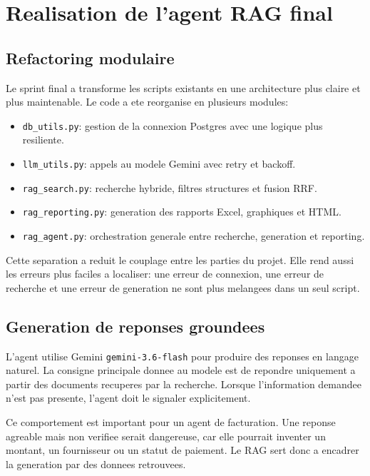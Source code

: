 \chapter{Realisation de l'agent RAG final}
\label{chap:agent-rag-final}

\section{Refactoring modulaire}

Le sprint final a transforme les scripts existants en une architecture plus claire et plus maintenable. Le code a ete reorganise en plusieurs modules:

\begin{itemize}
  \item \texttt{db\_utils.py}: gestion de la connexion Postgres avec une logique plus resiliente.
  \item \texttt{llm\_utils.py}: appels au modele Gemini avec retry et backoff.
  \item \texttt{rag\_search.py}: recherche hybride, filtres structures et fusion RRF.
  \item \texttt{rag\_reporting.py}: generation des rapports Excel, graphiques et HTML.
  \item \texttt{rag\_agent.py}: orchestration generale entre recherche, generation et reporting.
\end{itemize}

Cette separation a reduit le couplage entre les parties du projet. Elle rend aussi les erreurs plus faciles a localiser: une erreur de connexion, une erreur de recherche et une erreur de generation ne sont plus melangees dans un seul script.

\section{Generation de reponses groundees}

L'agent utilise Gemini \texttt{gemini-3.6-flash} pour produire des reponses en langage naturel. La consigne principale donnee au modele est de repondre uniquement a partir des documents recuperes par la recherche. Lorsque l'information demandee n'est pas presente, l'agent doit le signaler explicitement.

Ce comportement est important pour un agent de facturation. Une reponse agreable mais non verifiee serait dangereuse, car elle pourrait inventer un montant, un fournisseur ou un statut de paiement. Le RAG sert donc a encadrer la generation par des donnees retrouvees.

